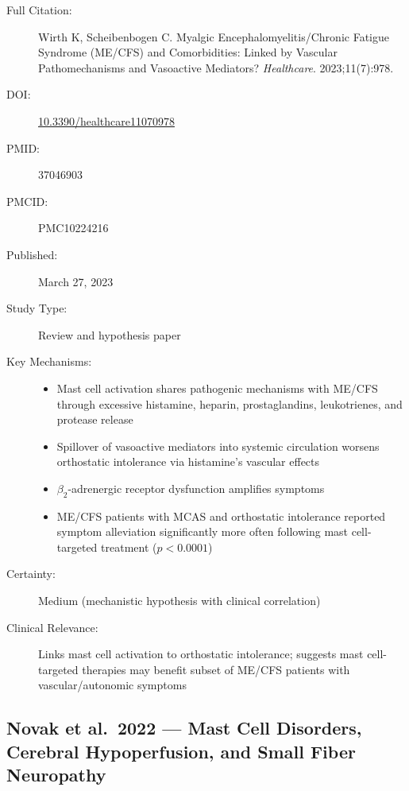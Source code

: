 \begin{description}
    \item[Full Citation:] Wirth K, Scheibenbogen C. Myalgic Encephalomyelitis/Chronic Fatigue Syndrome (ME/CFS) and Comorbidities: Linked by Vascular Pathomechanisms and Vasoactive Mediators? \textit{Healthcare}. 2023;11(7):978.
    \item[DOI:] \href{https://doi.org/10.3390/healthcare11070978}{10.3390/healthcare11070978}
    \item[PMID:] 37046903
    \item[PMCID:] PMC10224216
    \item[Published:] March 27, 2023
    \item[Study Type:] Review and hypothesis paper
    \item[Key Mechanisms:]
    \begin{itemize}
        \item Mast cell activation shares pathogenic mechanisms with ME/CFS through excessive histamine, heparin, prostaglandins, leukotrienes, and protease release
        \item Spillover of vasoactive mediators into systemic circulation worsens orthostatic intolerance via histamine's vascular effects
        \item $\beta_2$-adrenergic receptor dysfunction amplifies symptoms
        \item ME/CFS patients with MCAS and orthostatic intolerance reported symptom alleviation significantly more often following mast cell-targeted treatment ($p<0.0001$)
    \end{itemize}
    \item[Certainty:] Medium (mechanistic hypothesis with clinical correlation)
    \item[Clinical Relevance:] Links mast cell activation to orthostatic intolerance; suggests mast cell-targeted therapies may benefit subset of ME/CFS patients with vascular/autonomic symptoms
\end{description}

\subsection{Novak et al.\ 2022 --- Mast Cell Disorders, Cerebral Hypoperfusion, and Small Fiber Neuropathy}

